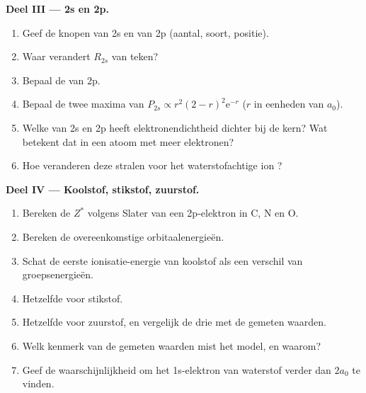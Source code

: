 \begin{problem}
\medskip
\noindent\textbf{Deel III --- 2s en 2p.}
\begin{enumerate}[resume]
  \item Geef de knopen van 2s en van 2p (aantal, soort, positie).
  \item Waar verandert $R_{2s}$ van teken?
  \item Bepaal de  van 2p.
  \item Bepaal de twee maxima van $P_{2s} \propto r^2(2 - r)^2\mathrm e^{-r}$ ($r$ in eenheden van
        $a_0$).
  \item Welke van 2s en 2p heeft elektronendichtheid dichter bij de kern? Wat
        betekent dat in een atoom met meer elektronen?
  \item Hoe veranderen deze stralen voor het waterstofachtige ion ?
\end{enumerate}

\medskip
\noindent\textbf{Deel IV --- Koolstof, stikstof, zuurstof.}
\begin{enumerate}[resume]
  \item Bereken de $Z^*$ volgens Slater van een 2p-elektron in C, N en O.
  \item Bereken de overeenkomstige orbitaalenergieën.
  \item Schat de eerste ionisatie-energie van koolstof als een verschil van groepsenergieën.
  \item Hetzelfde voor stikstof.
  \item Hetzelfde voor zuurstof, en vergelijk de drie met de gemeten waarden.
  \item Welk kenmerk van de gemeten waarden mist het model, en waarom?
  \item Geef de waarschijnlijkheid om het 1s-elektron van waterstof verder
        dan $2a_0$ te vinden.
\end{enumerate}
\end{problem}
